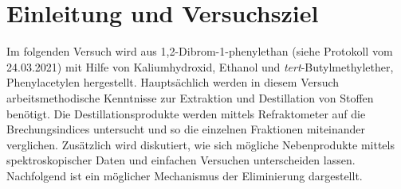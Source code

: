 \section{Einleitung und Versuchsziel}
\label{sec:aufgabenstellung}

Im folgenden Versuch wird aus 1,2-Dibrom-1-phenylethan (siehe Protokoll vom 24.03.2021) mit Hilfe von Kaliumhydroxid, Ethanol und \textit{tert}-Butylmethylether, Phenylacetylen hergestellt. Hauptsächlich werden in diesem Versuch arbeitsmethodische Kenntnisse zur Extraktion und Destillation von Stoffen benötigt. Die Destillationsprodukte werden mittels Refraktometer auf die Brechungsindices untersucht und so die einzelnen Fraktionen miteinander verglichen. Zusätzlich wird diskutiert, wie sich mögliche Nebenprodukte mittels spektroskopischer Daten und einfachen Versuchen unterscheiden lassen.\\
Nachfolgend ist ein möglicher Mechanismus der Eliminierung dargestellt.


